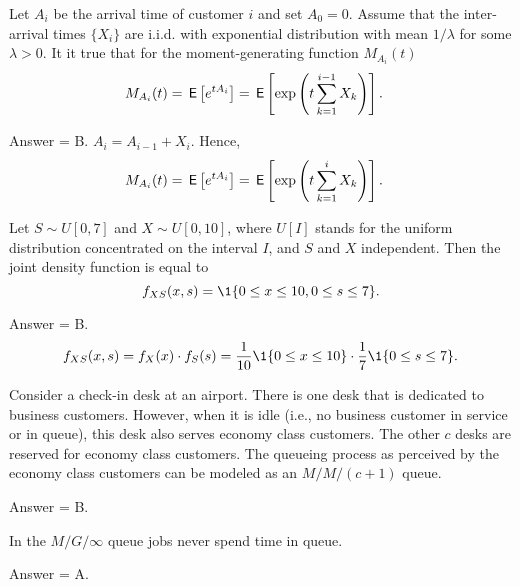 \begin{exercise}[201902]
 Let $A_i$ be the arrival time of customer $i$ and set $A_0=0$.
 Assume that the inter-arrival times $\{X_i\}$ are i.i.d. with
 exponential distribution with mean $1/\lambda$ for some
 $\lambda>0$. It it true that for the moment-generating function $M_{A_i}(t)$
\begin{align*}
 M_{A_i}(t) &= \,\mathsf{E}\left[e^{t A_i}\right] = \,\mathsf{E}\left[\exp\left(t\sum_{k=1}^{i-1} X_k\right)\right].
\end{align*}

\begin{solution}
Answer = B. $A_i = A_{i-1} + X_i$. Hence, 
\begin{align*}
 M_{A_i}(t) &= \,\mathsf{E}\left[e^{t A_i}\right] = \,\mathsf{E}\left[\exp\left(t\sum_{k=1}^{i} X_k\right)\right].
\end{align*}
\end{solution}
\end{exercise}

\begin{exercise}[201902]
 Let $S\sim U[0,7]$ and $X\sim U[0,10]$, where $U[I]$ stands for the
 uniform distribution concentrated on the interval $I$, and $S$ and $X$ independent. Then the joint density function is equal to 
\begin{equation*}
 f_{X S}(x,s) = \1{0\leq x \leq 10, 0\leq s \leq 7}.
\end{equation*}
\begin{solution}
Answer = B. %
\begin{equation*}
 f_{X S}(x, s) = f_X(x) \cdot f_S(s) = \frac{1}{10} \1{0\leq x \leq 10}\cdot \frac 17 \1{0\leq s \leq 7}.
\end{equation*}

\end{solution}
\end{exercise}

\begin{exercise}[201902]
Consider a check-in desk at an airport. There is one desk that is dedicated to business customers. However, when it is idle (i.e., no business customer in service or in queue), this desk also serves economy class customers. The other $c$ desks are reserved for economy class customers. The queueing process as perceived by the economy class customers can be modeled as an $M/M/(c+1)$ queue. 
\begin{solution}
Answer = B. 
\end{solution}
\end{exercise}

\begin{exercise}[201902]
In the $M/G/\infty$ queue jobs never spend time in queue.
\begin{solution}
Answer = A.
\end{solution}
\end{exercise}

